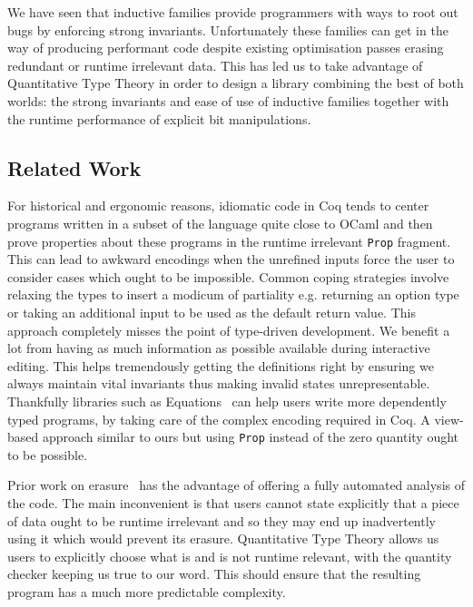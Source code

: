 \documentclass{article}
\newcommand{\coq}{Coq}
\begin{document}
We have seen that inductive families provide programmers with ways to root out bugs
by enforcing strong invariants. Unfortunately these families can get in the way of
producing performant code despite existing optimisation passes erasing redundant
or runtime irrelevant data.
%
This has led us to take advantage of Quantitative Type Theory in order to design a library
combining the best of both worlds: the strong invariants and ease of use of inductive
families together with the runtime performance of explicit bit manipulations.

\subsection{Related Work}

For historical and ergonomic reasons, idiomatic code in \coq{} tends to center programs
written in a subset of the language quite close to OCaml and then prove properties
about these programs in the runtime irrelevant \texttt{Prop} fragment.
%
This can lead to awkward encodings when the unrefined inputs force the user to consider
cases which ought to be impossible. Common coping strategies involve relaxing the types
to insert a modicum of partiality e.g. returning an option type or taking an additional
input to be used as the default return value.
%
This approach completely misses the point of type-driven development. We benefit a lot
from having as much information as possible available during interactive editing. This
helps tremendously getting the definitions right by ensuring we always maintain vital
invariants thus making invalid states unrepresentable.
%
Thankfully libraries such as Equations~\cite{DBLP:conf/itp/Sozeau10,DBLP:journals/pacmpl/SozeauM19}
can help users write more dependently typed programs, by taking care of the complex
encoding required in \coq{}. A view-based approach similar to ours but using \texttt{Prop}
instead of the zero quantity ought to be possible.

Prior work on erasure~\cite{DBLP:journals/pacmpl/Tejiscak20} has the advantage of
offering a fully automated analysis of the code. The main inconvenient is that users
cannot state explicitly that a piece of data ought to be runtime irrelevant and so
they may end up inadvertently using it which would prevent its erasure.
%
Quantitative Type Theory allows us users to explicitly choose what is and is not
runtime relevant, with the quantity checker keeping us true to our word.
%
This should ensure that the resulting program has a much more predictable complexity.
\end{document}
